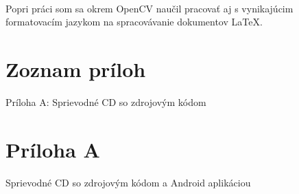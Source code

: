 \documentclass[12pt]{article}
\begin{document}
\paragraph{}
Popri práci som sa okrem OpenCV naučil pracovať aj s vynikajúcim formatovacím jazykom na spracovávanie dokumentov LaTeX.
\clearpage



\clearpage

\section*{Zoznam príloh}
Príloha A: Sprievodné CD so zdrojovým kódom
\clearpage

\section*{Príloha A}
Sprievodné CD so zdrojovým kódom a Android aplikáciou

\clearpage
\end{document}
